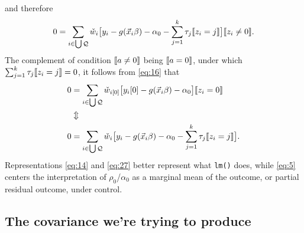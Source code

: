 \documentclass{article}
\DeclarePairedDelimiter{\indicator}{\llbracket}{\rrbracket}
\newcommand{\owt}[1][{[z_{i}]}]{\ensuremath{\check{w}_{i#1}}}
\begin{document}
and therefore
\begin{equation*}
       0 = \sum_{i \in \bigcup \mathcal{Q}}\owt[]\big[y_{i} - g(\vec{x}_{i}\beta)-
                  \alpha_{0}-\sum_{j=1}^{k}\tau_{j}\indicator{z_{i}=j}\big]\indicator{z_{i}
                  \neq 0}.
\end{equation*}
The complement of condition $\indicator{a\neq 0}$ being
$\indicator{a=0}$, under which
$\sum_{j=1}^{k}\tau_{j}\indicator{z_{i}=j}=0$, it follows from \eqref{eq:16} that
\begin{align*}
         0 &= \sum_{i \in \bigcup \mathcal{Q}}\owt[{[0]}]\big[y_{i}[0] - g(\vec{x}_{i}\beta)-
                  \alpha_{0}\big]\indicator{z_{i}
             =0}\\
           & \Updownarrow \\
         0 &= \sum_{i \in \bigcup \mathcal{Q}}\owt[]\big[y_{i} - g(\vec{x}_{i}\beta)-
                  \alpha_{0} - \sum_{j=1}^{k}\tau_{j}\indicator{z_{i}=j}\big].
\end{align*}
Representations \eqref{eq:14} and \eqref{eq:27} better represent what
\texttt{lm()} does, while \eqref{eq:5} centers the interpretation of $\rho_{0}$/$\alpha_{0}$ as a
marginal mean of the outcome, or partial residual outcome, under control.

\subsection{The covariance we're trying to
  produce}\label{sec:covar-were-trying}
\end{document}
